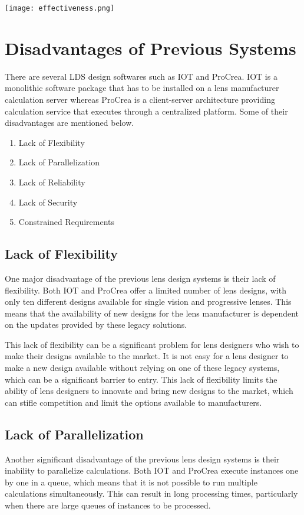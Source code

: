\documentclass[10pt,a4paper]{report}
\begin{document}
\begin{center}
    \texttt{[image: effectiveness.png]}
\end{center}
\newpage


\section{Disadvantages of Previous Systems}
\large\justify There are several LDS design softwares such as IOT and ProCrea. IOT is a monolithic software package that has to be installed on a lens manufacturer calculation server whereas ProCrea is a client-server architecture providing calculation service that executes through a centralized platform. Some of their disadvantages are mentioned below.

\begin{enumerate}
    \item Lack of Flexibility
    \item Lack of Parallelization
    \item Lack of Reliability
    \item Lack of Security
    \item Constrained Requirements
\end{enumerate}

\subsection{Lack of Flexibility}
\large\justify One major disadvantage of the previous lens design systems is their lack of flexibility. Both IOT and ProCrea offer a limited number of lens designs, with only ten different designs available for single vision and progressive lenses. This means that the availability of new designs for the lens manufacturer is dependent on the updates provided by these legacy solutions.

\large\justify This lack of flexibility can be a significant problem for lens designers who wish to make their designs available to the market. It is not easy for a lens designer to make a new design available without relying on one of these legacy systems, which can be a significant barrier to entry. This lack of flexibility limits the ability of lens designers to innovate and bring new designs to the market, which can stifle competition and limit the options available to manufacturers.

\subsection{Lack of Parallelization}
\large\justify Another significant disadvantage of the previous lens design systems is their inability to parallelize calculations. Both IOT and ProCrea execute instances one by one in a queue, which means that it is not possible to run multiple calculations simultaneously. This can result in long processing times, particularly when there are large queues of instances to be processed.
\end{document}
